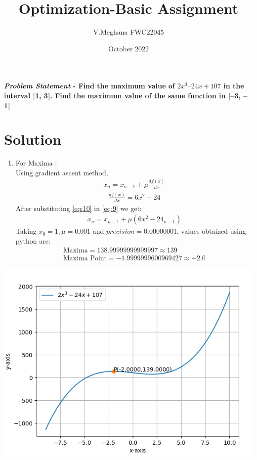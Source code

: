 \documentclass[journal,10pt,twocolumn]{article}
\title{\textbf{Optimization-Basic Assignment}}
\author{V.Meghana \hspace{9cm} FWC22045}
\date{October 2022}
\begin{document}
\maketitle
\paragraph{\textit{Problem Statement} - Find the maximum value of $2x^3 – 24x + 107$ in the interval [1, 3]. Find the maximum value of the same function in [–3, –1]}

\section*{\large Solution}

\begin{enumerate}
\item For Maxima : \\
    Using gradient ascent method,
\begin{align}
    x_n=x_{n-1}+\mu\frac{df(x)}{dx} \label{eq:9}
    \end{align}
    \begin{align}
    \frac{df(x)}{dx}=6x^2-24 \label{eq:10}
\end{align}
After substituting \ref{eq:10} in \ref{eq:9} we get:
\begin{align}
    x_n=x_{n-1}+\mu(6x^2-24_{n-1})\label{eq:11}
\end{align}
Taking $x_0 = 1, \mu = 0.001$ and $precision = 0.00000001$, values obtained using python are:
\begin{align}
\boxed{\text{Maxima} = 138.99999999999997 \approx 139} \\
\boxed{\text{Maxima Point} = -1.9999999600969427 \approx -2.0}
\end{align}
\end{enumerate}

\includegraphics[width=1\columnwidth]{opt_basic.png}
\centering {}
\end{document}

